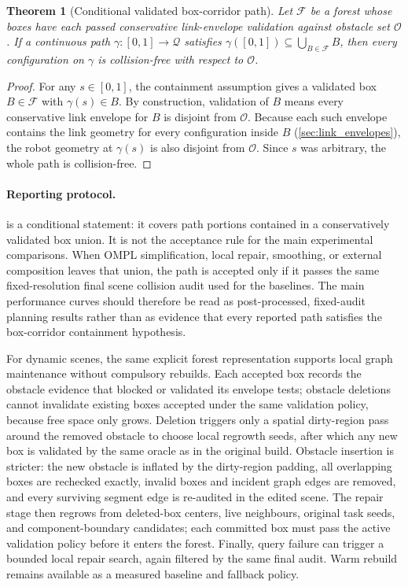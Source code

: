 \documentclass[journal]{IEEEtran}
\newtheorem{theorem}{Theorem}
\newcommand{\calO}{\ensuremath{\mathcal{O}}}
\newcommand{\Q}{\ensuremath{\mathcal{Q}}}
\begin{document}
\begin{theorem}[Conditional validated box-corridor path]
\label{thm:corridor_certificate}
Let $\mathcal{F}$ be a forest whose boxes have each passed conservative
link-envelope validation against obstacle set $\calO$. If a continuous path
$\gamma:[0,1]\to\Q$ satisfies
$\gamma([0,1])\subseteq \bigcup_{B\in\mathcal{F}}B$, then every configuration
on $\gamma$ is collision-free with respect to $\calO$.
\end{theorem}

\begin{proof}
For any $s\in[0,1]$, the containment assumption gives a validated box
$B\in\mathcal{F}$ with $\gamma(s)\in B$. By construction, validation of $B$
means every conservative link envelope for $B$ is disjoint from $\calO$.
Because each such envelope contains the link geometry for every configuration
inside $B$ (\cref{sec:link_envelopes}), the robot geometry at $\gamma(s)$ is
also disjoint from $\calO$. Since $s$ was arbitrary, the whole path is
collision-free.
\end{proof}

\paragraph{Reporting protocol.}
 is a conditional statement: it covers path
portions contained in a conservatively validated box union. It is not the
acceptance rule for the main experimental comparisons. When OMPL simplification,
local repair, smoothing, or external composition leaves that union, the path is
accepted only if it passes the same fixed-resolution final scene collision audit
used for the baselines. The main performance curves should therefore be read as
post-processed, fixed-audit planning results rather than as evidence that every
reported path satisfies the box-corridor containment hypothesis.

For dynamic scenes, the same explicit forest representation supports local
graph maintenance without compulsory rebuilds. Each accepted box records the
obstacle evidence that blocked or validated its envelope tests; obstacle
deletions cannot invalidate existing boxes accepted under the same validation
policy, because free space only grows. Deletion triggers only a spatial dirty-region pass around the removed
obstacle to choose local regrowth seeds, after which any new box is validated by
the same oracle as in the original build. Obstacle insertion is stricter: the
new obstacle is inflated by the dirty-region padding, all overlapping boxes are
rechecked exactly, invalid boxes and incident graph edges are removed, and every
surviving segment edge is re-audited in the edited scene. The repair stage then
regrows from deleted-box centers, live neighbours, original task seeds, and
component-boundary candidates; each committed box must pass the active
validation policy before it enters the forest. Finally, query failure can trigger a
bounded local repair search, again filtered by the same final audit. Warm
rebuild remains available as a measured baseline and fallback policy.
\end{document}
